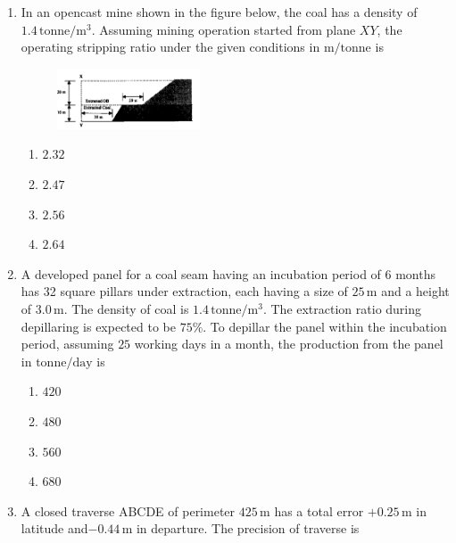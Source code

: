 \documentclass[journal,12pt,onecolumn]{IEEEtran}
\theoremstyle{remark}
\begin{document}
\begin{enumerate}
\item In an opencast mine shown in the figure below, the coal has a density of $1.4\, \mathrm{tonne}/\mathrm{m}^3$. Assuming
mining operation started from plane $XY$, the operating stripping ratio under the given conditions in 
$\mathrm{m}/\mathrm{tonne}$ is

\hfill{}
\begin{figure}[H]
\centering
\includegraphics[width=0.4\textwidth]{figs/37.png}
\end{figure}
\begin{multicols}{4}
\begin{enumerate}
\item $ 2.32$
\item $ 2.47$
\item $ 2.56$
\item $ 2.64$
\end{enumerate}
\end{multicols}

\item A developed panel for a coal seam having an incubation period of 6 months has 32 square pillars 
under extraction, each having a size of $25\,\mathrm{m}$ and a height of $3.0\,\mathrm{m}$. 
The density of coal is $1.4\,\mathrm{tonne/m^3}$. The extraction ratio during depillaring is expected to be $75\%$. 
To depillar the panel within the incubation period, assuming $25$ working days in a month, the production from  the panel in $\mathrm{tonne/day}$ is

\hfill{}
\begin{multicols}{4}
\begin{enumerate}
\item $420$
\item $480$
\item $560$
\item $680$
\end{enumerate}
\end{multicols}

\item A closed traverse ABCDE of perimeter $425\,\mathrm{m}$ has a total error $+0.25\,\mathrm{m}$ in latitude and$-0.44\,\mathrm{m}$ in departure. The precision of traverse is


\end{enumerate}
\end{document}
